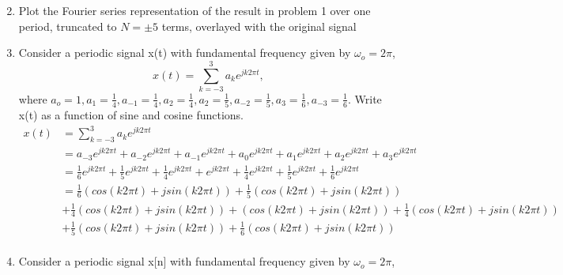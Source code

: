 \documentclass{article}
\begin{document}
\begin{enumerate}
\begin{equation}
    \end{equation}
    \item Plot the Fourier series representation of the result in problem 1 over one period, truncated to $N = \pm 5$ terms, overlayed with the original signal
    \begin{center}
    \end{center}
    \newpage
    \item Consider a periodic signal x(t) with fundamental frequency given by $\omega_o= 2\pi$,
    \begin{equation}
        x(t) = \sum_{k=-3}^3 a_ke^{jk2\pi t},
    \end{equation}
    where $a_o = 1, a_1 =\frac{1}{4}, a_{-1}=\frac{1}{4}, a_2 = \frac{1}{4}, a_2 = \frac{1}{5}, a_{-2} = \frac{1}{5}, a_3 = \frac{1}{6}, a_{-3} = \frac{1}{6}$. Write x(t) as a function of sine and cosine functions.
    \begin{align}
        x(t) &= \sum_{k=-3}^3 a_ke^{jk2\pi t}\\
        &= a_{-3}e^{jk2\pi t}+a_{-2}e^{jk2\pi t} + a_{-1}e^{jk2\pi t} + a_{0}e^{jk2\pi t} + a_{1}e^{jk2\pi t} +  a_{2}e^{jk2\pi t} + a_{3}e^{jk2\pi t}\\
        &= \frac{1}{6}e^{jk2\pi t} + \frac{1}{5}e^{jk2\pi t} + \frac{1}{4}e^{jk2\pi t} + e^{jk2\pi t} + \frac{1}{4}e^{jk2\pi t} +  \frac{1}{5}e^{jk2\pi t} + \frac{1}{6}e^{jk2\pi t}\\
        &= \frac{1}{6}(cos(k2\pi t)+jsin(k2\pi t))+ \frac{1}{5}(cos(k2\pi t)+jsin(k2\pi t))\\ &+ \frac{1}{4}(cos(k2\pi t)+jsin(k2\pi t))+ (cos(k2\pi t)+jsin(k2\pi t))+ \frac{1}{4}(cos(k2\pi t)+jsin(k2\pi t))\\ &+  \frac{1}{5}(cos(k2\pi t)+jsin(k2\pi t))+ \frac{1}{6}(cos(k2\pi t)+jsin(k2\pi t))\\
    \end{align}
    \newpage
    \item Consider a periodic signal x[n] with fundamental frequency given by $\omega_o = 2\pi$,

\end{enumerate}
\end{document}
